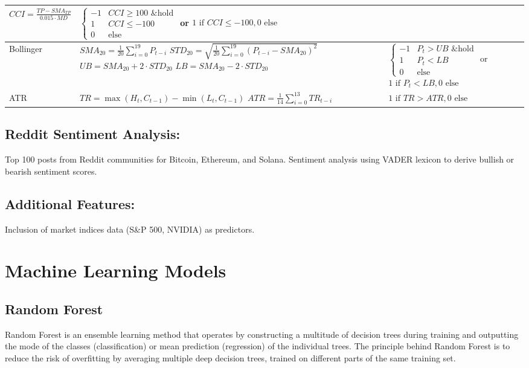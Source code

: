 \begin{tabular}{|>{\raggedright\arraybackslash}m{2cm}|>{\raggedright\arraybackslash}m{10cm}|>{\raggedright\arraybackslash}m{5cm}|}
$CCI = \frac{TP - SMA_{TP}}{0.015 \cdot MD}$ & $\begin{cases}
-1 & CCI \geq 100 \text{ \& hold} \\
1 & CCI \leq -100 \\
0 & \text{else}
\end{cases}$ \newline
or \newline
$1 \text{ if } CCI \leq -100, 0 \text{ else}$ \\
\hline
Bollinger & $SMA_{20} = \frac{1}{20} \sum_{i=0}^{19} P_{t-i}$ \newline
$STD_{20} = \sqrt{\frac{1}{20} \sum_{i=0}^{19} (P_{t-i} - SMA_{20})^2}$ \newline
$UB = SMA_{20} + 2 \cdot STD_{20}$ \newline
$LB = SMA_{20} - 2 \cdot STD_{20}$ & $\begin{cases}
-1 & P_t > UB \text{ \& hold} \\
1 & P_t < LB \\
0 & \text{else}
\end{cases}$ \newline
or \newline
$1 \text{ if } P_t < LB, 0 \text{ else}$ \\
\hline
ATR & $TR = \max(H_t, C_{t-1}) - \min(L_t, C_{t-1})$ \newline
$ATR = \frac{1}{14} \sum_{i=0}^{13} TR_{t-i}$ & $1 \text{ if } TR > ATR, 0 \text{ else}$ \\
\hline
\end{tabular}



\subsection{Reddit Sentiment Analysis:} Top 100 posts from Reddit communities for Bitcoin, Ethereum, and Solana. Sentiment analysis using VADER lexicon to derive bullish or bearish sentiment scores.
\subsection{Additional Features:} Inclusion of market indices data (S\&P 500, NVIDIA) as predictors.


\section{Machine Learning Models}
\subsection{Random Forest}
Random Forest is an ensemble learning method that operates by constructing a multitude of decision trees during training and outputting the mode of the classes (classification) or mean prediction (regression) of the individual trees. The principle behind Random Forest is to reduce the risk of overfitting by averaging multiple deep decision trees, trained on different parts of the same training set.

